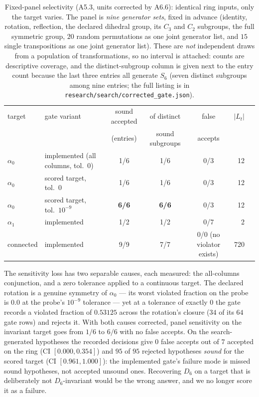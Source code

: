 \documentclass[11pt]{article}
\begin{document}
\begin{table}[t]
\centering
\caption{Fixed-panel selectivity (A5.3, units corrected by A6.6): identical ring
inputs, only the target varies. The panel is \emph{nine generator sets}, fixed in advance
(identity, rotation, reflection, the declared dihedral group, its $C_3$ and $C_2$ subgroups,
the full symmetric group, $20$ random permutations as one joint generator list, and $15$ single
transpositions as one joint generator list). These are \emph{not} independent draws from a
population of transformations, so no interval is attached: counts are descriptive coverage, and
the distinct-subgroup column is given next to the entry count because the last three entries all
generate $S_6$ (seven distinct subgroups among nine entries; the full listing is in
\texttt{research/search/corrected\_gate.json}).}
\label{tab:panel}
\small
\begin{tabular}{@{}llcccrr@{}}
\toprule
target & gate variant & sound accepted & of distinct & false & $|L_t|$ \\
 & & (entries) & sound subgroups & accepts & \\
\midrule
$\alpha_0$ & implemented (all columns, tol.\ $0$) & 1/6 & 1/6 & 0/3 & 12 \\
$\alpha_0$ & scored target, tol.\ $0$ & 1/6 & 1/6 & 0/3 & 12 \\
$\alpha_0$ & scored target, tol.\ $10^{-9}$ & \textbf{6/6} & \textbf{6/6} & 0/3 & 12 \\
$\alpha_1$ & implemented & 1/2 & 1/2 & 0/7 & 2 \\
connected & implemented & 9/9 & 7/7 & 0/0 (no violator exists) & 720 \\
\bottomrule
\end{tabular}
\end{table}

The sensitivity loss has two separable causes, each measured: the all-columns conjunction,
and a zero tolerance applied to a continuous target. The declared rotation is a genuine
symmetry of $\alpha_0$ --- its worst violated fraction on the probe is $0.0$ at the probe's
$10^{-9}$ tolerance --- yet at a tolerance of exactly $0$ the gate records a violated fraction
of $0.53125$ across the rotation's closure ($34$ of its $64$ gate rows) and rejects it. With
both causes corrected, panel sensitivity on the invariant target goes from $1/6$ to $6/6$
with no false accepts. On the search-generated hypotheses the recorded decisions give
$0$ false accepts out of $7$ accepted on the ring (CI $[0.000,0.354]$) and $95$ of $95$
rejected hypotheses \emph{sound} for the scored target (CI $[0.961,1.000]$): the implemented
gate's failure mode is missed sound hypotheses, not accepted unsound ones. Recovering $D_6$
on a target that is deliberately not $D_6$-invariant would be the wrong answer, and we no
longer score it as a failure.
\end{document}
